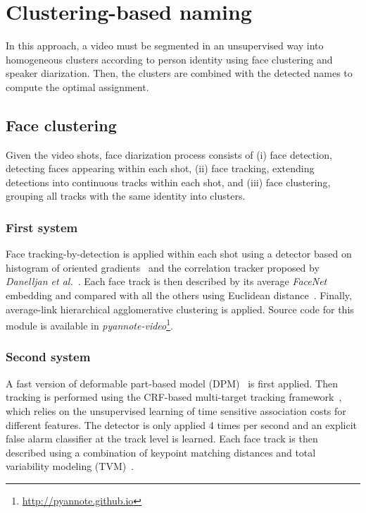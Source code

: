 \section{Clustering-based naming}
\label{sec:clustering}

In this approach, a video must be segmented in an unsupervised way into homogeneous clusters according to person identity using face clustering and speaker diarization. Then, the clusters are combined with the detected names to compute the optimal assignment.

\subsection{Face clustering}

Given the video shots, face diarization process consists of (i) face detection, detecting faces appearing within each shot, (ii) face tracking, extending detections into continuous tracks within each shot, and (iii) face clustering, grouping all tracks with the same identity into clusters.

\subsubsection{First system}

Face tracking-by-detection is applied within each shot using a detector based on histogram of oriented gradients~\cite{Dalal2005} and the correlation tracker proposed by \emph{Danelljan et al.}~\cite{Danelljan2014}. 
%
Each face track is then described by its average \emph{FaceNet} embedding and compared with all the others using Euclidean distance~\cite{Schroff2015}. 
%
Finally, average-link hierarchical agglomerative clustering is applied. Source code for this module is available in \emph{pyannote-video}\footnote{\url{http://pyannote.github.io}}.

\subsubsection{Second system}

A fast version of deformable part-based model (DPM)~\cite{felzenszwalb2010dpm,mathias2014face,dubout2013deformable} is first applied. Then tracking is performed using the CRF-based multi-target tracking framework~\cite{heili2014tracking}, which relies on the unsupervised learning of time sensitive association costs for different features.
%
The detector is only applied 4 times per second and an explicit false alarm classifier at the track level is learned\cite{Le_ICPR_2016}.
%
Each face track is then described using a combination of keypoint matching distances and total variability modeling (TVM)~\cite{wallace2011inter,wallace2012total,Khoury:ICMR:2013}.

